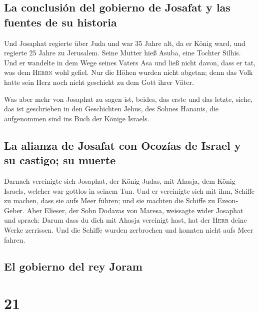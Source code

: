 \hypertarget{la-conclusiuxf3n-del-gobierno-de-josafat-y-las-fuentes-de-su-historia}{%
\subsection{La conclusión del gobierno de Josafat y las fuentes de su
historia}\label{la-conclusiuxf3n-del-gobierno-de-josafat-y-las-fuentes-de-su-historia}}

 Und Josaphat regierte über Juda und war 35 Jahre alt, da
er König ward, und regierte 25 Jahre zu Jerusalem. Seine Mutter hieß
Asuba, eine Tochter Silhis.  Und er wandelte in dem Wege
seines Vaters Asa und ließ nicht davon, dass er tat, was dem
\textsc{Herrn} wohl gefiel.  Nur die Höhen wurden nicht
abgetan; denn das Volk hatte sein Herz noch nicht geschickt zu dem Gott
ihrer Väter.

 Was aber mehr von Josaphat zu sagen ist, beides, das
erste und das letzte, siehe, das ist geschrieben in den Geschichten
Jehus, des Sohnes Hananis, die aufgenommen sind ins Buch der Könige
Israels.

\hypertarget{la-alianza-de-josafat-con-ocozuxedas-de-israel-y-su-castigo-su-muerte}{%
\subsection{La alianza de Josafat con Ocozías de Israel y su castigo; su
muerte}\label{la-alianza-de-josafat-con-ocozuxedas-de-israel-y-su-castigo-su-muerte}}

 Darnach vereinigte sich Josaphat, der König Judas, mit
Ahasja, dem König Israels, welcher war gottlos in seinem Tun.
 Und er vereinigte sich mit ihm, Schiffe zu machen, dass
sie aufs Meer führen; und sie machten die Schiffe zu Ezeon-Geber.
 Aber Elieser, der Sohn Dodavas von Maresa, weissagte
wider Josaphat und sprach: Darum dass du dich mit Ahasja vereinigt hast,
hat der \textsc{Herr} deine Werke zerrissen. Und die Schiffe wurden
zerbrochen und konnten nicht aufs Meer fahren.

\hypertarget{el-gobierno-del-rey-joram}{%
\subsection{El gobierno del rey Joram}\label{el-gobierno-del-rey-joram}}

\hypertarget{section-20}{%
\section{21}\label{section-20}}

